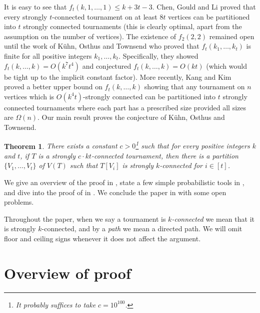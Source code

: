 \documentclass[english]{article}
\theoremstyle{plain}
\newtheorem{theorem}{Theorem}[section]
\theoremstyle{remark}
\begin{document}
	It is easy to see that $f_t(k, 1, \ldots, 1) \le k + 3t - 3$. Chen, Gould and Li \cite{chen2001partitioning} proved that every strongly $t$-connected tournament on at least $8t$ vertices can be partitioned into $t$ strongly connected tournaments (this is clearly optimal, apart from the assumption on the number of vertices). The existence of $f_2(2,2)$ remained open until the work of K\"uhn, Osthus and Townsend \cite{kuhn2016proof} who proved that $f_t(k_1, \ldots, k_t)$ is finite for all positive integers $k_1, \ldots, k_t$. Specifically, they showed $f_t(k, \ldots, k) = O(k^7 t^4)$ and conjectured $f_t(k, \ldots, k) = O(kt)$ (which would be tight up to the implicit constant factor). More recently, Kang and Kim~\cite{KangKim} proved a better upper bound on  $f_t(k,\ldots ,k)$ showing that any tournament on $n$ vertices which is $O(k^4t)$-strongly connected can be partitioned into $t$ strongly connected tournaments where each part has a prescribed size provided all sizes are $\Omega(n)$. 
	Our main result proves the conjecture of K\"uhn, Osthus and Townsend.  
	
	\begin{theorem} \label{thm:main}
		There exists a constant $c > 0$\footnote{It probably suffices to take $c = 10^{100}$.} such that for every positive integers $k$ and $t$, if $T$ is a strongly $c \cdot kt$-connected tournament, then there is a partition $\{V_1, \ldots, V_{t}\}$ of $V(T)$ such that $T[V_i]$ is strongly $k$-connected for $i \in [t]$.
	\end{theorem} 

	We give an overview of the proof in , state a few simple probabilistic tools in , and dive into the proof of  in . We conclude the paper in  with some open problems.

	Throughout the paper, when we say a tournament is \emph{$k$-connected} we mean that it is strongly $k$-connected, and by a \emph{path} we mean a directed path. We will omit floor and ceiling signs whenever it does not affect the argument.

\section{Overview of proof} \label{sec:overview}
\end{document}

